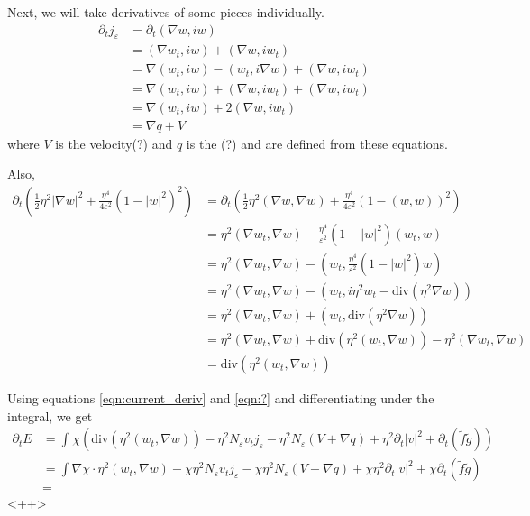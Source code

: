 \documentclass[a4paper]{article}
\renewcommand{\div}{\mathrm{div}}
\begin{document}
Next, we will take derivatives of some pieces individually.
\begin{align} \label{eqn:current_deriv}
  \partial_t j_\varepsilon &= \partial_t (\nabla w, iw) \nonumber \\
  &= ( \nabla w_t, iw ) + ( \nabla w, i w_t) \nonumber \\
  &= \nabla( w_t, iw) - (w_t, i \nabla w) + ( \nabla w, i w_t) \nonumber \\
  &= \nabla( w_t, iw) + (\nabla w, i w_t) + ( \nabla w, i w_t) \nonumber \\
  &= \nabla( w_t, iw) + 2(\nabla w, i w_t) \\
  &= \nabla q + V \nonumber
\end{align}
where $V$ is the velocity(?) and $q$ is the (?) and are defined from these equations.

Also,
\begin{align} \label{eqn:?}
  \partial_t \left( \frac{1}{2} \eta^2 | \nabla w |^2 + \frac{\eta^4}{4 \varepsilon^2} (1-|w|^2)^2 \right) &= \partial_t \left( \frac{1}{2} \eta^2
  (\nabla w, \nabla w) + \frac{\eta^4}{4 \varepsilon^2} ( 1 - (w,w))^2 \right) \nonumber \\
  &= \eta^2 (\nabla w_t, \nabla w) - \frac{\eta^4}{ \varepsilon^2} (1 - |w|^2) (w_t,w) \nonumber \\
  &= \eta^2 (\nabla w_t, \nabla w) - \left( w_t, \frac{\eta^4}{\varepsilon^2} (1 - |w|^2)w \right) \nonumber \\
  &= \eta^2 (\nabla w_t, \nabla w) - (w_t, i \eta^2 w_t - \div(\eta^2 \nabla w) ) \nonumber \\
  &= \eta^2 (\nabla w_t, \nabla w) + (w_t, \div(\eta^2 \nabla w)) \nonumber \\
  &= \eta^2 (\nabla w_t, \nabla w) + \div (\eta^2 (w_t, \nabla w)) - \eta^2 (\nabla w_t, \nabla w) \nonumber \\
  &= \div( \eta^2 ( w_t, \nabla w) )
\end{align}

Using equations \eqref{eqn:current_deriv} and \eqref{eqn:?} and differentiating under the integral, we get
\begin{align}
  \partial_t E &= \int_{}^{} \chi \left( \div(\eta^2 (w_t, \nabla w)) - \eta^2 N_\varepsilon v_t j_\varepsilon - \eta^2 N_\varepsilon (V + \nabla q) +
  \eta^2 \partial_t |v|^2 + \partial_t (\tilde{f} \tilde{g}) \right) \nonumber \\
  &= \int \nabla \chi \cdot \eta^2 (w_t, \nabla w) - \chi \eta^2 N_\varepsilon v_t j_\varepsilon - \chi \eta^2 N_\varepsilon(V + \nabla q) + \chi \eta^2
  \partial_t |v|^2 + \chi \partial_t (\tilde{f} \tilde{g}) \nonumber \\
  &=
  \label{<++>}
\end{align}<++>
\end{document}
